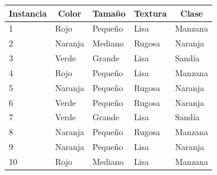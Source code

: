 \documentclass[11pt,fleqn]{book} %
\begin{document}
\FloatBarrier
\begin{table}[ht]
\begin{tabular}{|l|l|l|l|l|}
\hline
\multicolumn{1}{|c|}{\textbf{Instancia}} & \multicolumn{1}{c|}{\textbf{Color}} & \multicolumn{1}{c|}{\textbf{Tamaño}} & \multicolumn{1}{c|}{\textbf{Textura}} & \multicolumn{1}{c|}{\textbf{Clase}} \\ \hline
1                                        & Rojo                                & Pequeño                              & Lisa                                  & Manzana                             \\ \hline
2                                        & Naranja                             & Mediano                              & Rugosa                                & Naranja                             \\ \hline
3                                        & Verde                               & Grande                               & Lisa                                  & Sandía                              \\ \hline
4                                        & Rojo                                & Pequeño                              & Lisa                                  & Manzana                             \\ \hline
5                                        & Naranja                             & Pequeño                              & Rugosa                                & Naranja                             \\ \hline
6                                        & Verde                               & Pequeño                              & Rugosa                                & Naranja                             \\ \hline
7                                        & Verde                               & Grande                               & Lisa                                  & Sandía                              \\ \hline
8                                        & Naranja                             & Pequeño                              & Rugosa                                & Manzana                             \\ \hline
9                                        & Naranja                             & Pequeño                              & Lisa                                  & Naranja                             \\ \hline
10                                       & Rojo                                & Mediano                              & Lisa                                  & Manzana                             \\ \hline
\end{tabular}
\end{table}
\FloatBarrier
\end{document}
